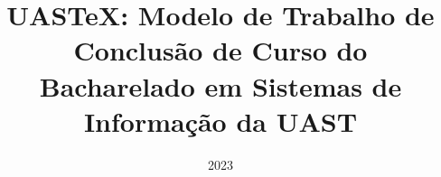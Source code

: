 \title{UAS\TeX: Modelo de Trabalho de Conclusão de Curso do Bacharelado em Sistemas de Informação da UAST} %




\date{2023}


\address{\uastaddress
\nextinstitute
Centro de Informática (CIn)\\
Universidade Federal de Pernambuco (UFPE)\\
Recife -- PE -- Brasil
\nextinstitute
Escola Politécnica de Pernambuco (POLI)\\
Universidade de Pernambuco (UPE)\\
Recife -- PE -- Brasil\\
} 

